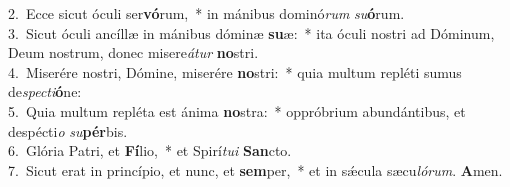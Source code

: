 {2.~}Ecce sicut óculi ser\textbf{vó}rum,~* in mánibus dominó\textit{rum} \textit{su}\textbf{ó}rum.\\
{3.~}Sicut óculi ancíllæ in mánibus dóminæ \textbf{su}æ:~* ita óculi nostri ad Dóminum, Deum nostrum, donec misere\textit{á}\textit{tur} \textbf{no}stri.\\
{4.~}Miserére nostri, Dómine, miserére \textbf{no}stri:~* quia multum repléti sumus de\textit{spe}\textit{cti}\textbf{ó}ne:\\
{5.~}Quia multum repléta est ánima \textbf{no}stra:~* oppróbrium abundántibus, et despécti\textit{o} \textit{su}\textbf{pér}bis.\\
{6.~}Glória Patri, et \textbf{Fí}lio,~* et Spirí\textit{tu}\textit{i} \textbf{San}cto.\\
{7.~}Sicut erat in princípio, et nunc, et \textbf{sem}per,~* et in sǽcula sæcu\textit{ló}\textit{rum}. \textbf{A}men.\\
